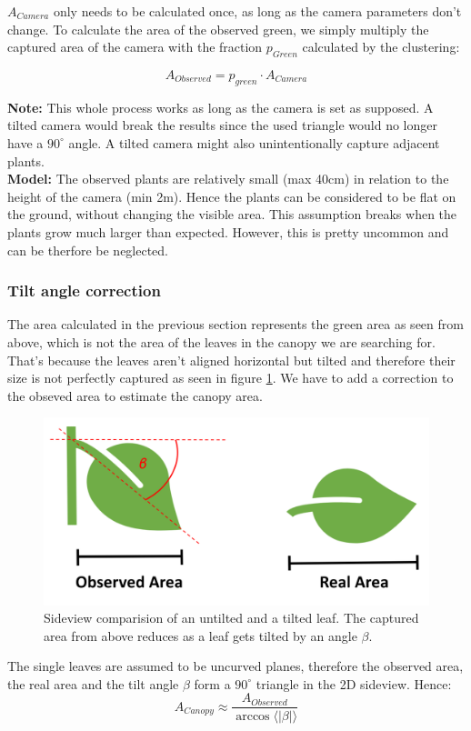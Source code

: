 $A_{Camera}$ only needs to be calculated once, as long as the camera parameters don't change. To calculate the area of the observed green, we simply multiply the captured area of the camera with the fraction $p_{Green}$ calculated by the clustering: 

$$A_{Observed} = p_{green}\cdot A_{Camera}$$

\textbf{Note:} This whole process works as long as the camera is set as supposed. A tilted camera would break the results since the used triangle would no longer have a $90^{\circ}$ angle. A tilted camera might also unintentionally capture adjacent plants.\\
\textbf{Model:} The observed plants are relatively small (max 40cm) in relation to the height of the camera (min 2m). Hence the plants can be considered to be flat on the ground, without changing the visible area. This assumption breaks when the plants grow much larger than expected. However, this is pretty uncommon and can be therfore be neglected.

\subsubsection{Tilt angle correction}


The area calculated in the previous section represents the green area as seen from above, which is not the area of the leaves in the canopy we are searching for. That's because the leaves aren't aligned horizontal but tilted and therefore their size is not perfectly captured as seen in figure \ref{fig:tiltedLeaf}. We have to add a correction to the obseved area to estimate the canopy area.\\
   \begin{figure}[H]
       \centering
       \includegraphics[scale=0.6]{tiltedLeaf.PNG}
       \caption{Sideview comparision of an untilted and a tilted leaf. The captured area from above reduces as a leaf gets tilted by an angle $\beta$.}
       \label{fig:tiltedLeaf}
   \end{figure}
The single leaves are assumed to be uncurved planes, therefore the observed area, the real area and the tilt angle $\beta$ form a $90^{\circ}$ triangle in the 2D sideview. Hence:
$$A_{Canopy} \approx \frac{A_{Observed}}{\arccos \langle |\beta |\rangle }$$

